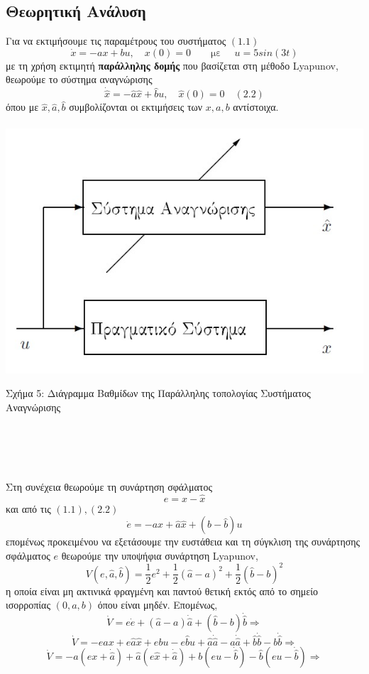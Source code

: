 \documentclass[12pt]{article}
\begin{document}
\subsection{Θεωρητική Ανάλυση}
Για να εκτιμήσουμε τις παραμέτρους του συστήματος $(1.1)$ 
\[ \dot{x}=-ax+bu , \quad x(0)=0 \qquad \text{με }  \quad u=5sin(3t) \]
με τη χρήση εκτιμητή \textbf{παράλληλης δομής} που βασίζεται στη μέθοδο Lyapunov, θεωρούμε το σύστημα αναγνώρισης
\[ \dot{\hat{x}}=-\hat{a}\hat{x}+\hat{b}u , \quad \hat{x}(0)=0 \quad (2.2) \]
όπου με $\hat{x},\hat{a},\hat{b}$ συμβολίζονται οι εκτιμήσεις των $x,a,b$ αντίστοιχα.
\\ \\
\includegraphics[width=\linewidth]{Par.jpg}
\centerline{Σχήμα 5: Διάγραμμα Βαθμίδων της Παράλληλης τοπολογίας Συστήματος Αναγνώρισης}
\\ \\ \\ \\
Στη συνέχεια θεωρούμε τη συνάρτηση σφάλματος 
\[e=x-\hat{x}\]
και από τις $(1.1),(2.2)$
\[\dot{e}=-ax+\hat{a}\hat{x}+(b-\hat{b})u  \]
επομένως προκειμένου να εξετάσουμε την ευστάθεια και τη σύγκλιση της συνάρτησης σφάλματος $e$ θεωρούμε την υποψήφια συνάρτηση Lyapunov,
\[V(e,\hat{a},\hat{b})=\frac{1}{2}e^{2}+\frac{1}{2}(\hat{a}-a)^2 + \frac{1}{2}(\hat{b}-b)^2\] η οποία είναι μη ακτινικά φραγμένη και παντού θετική εκτός από το σημείο ισορροπίας $(0,a,b)$ όπου είναι μηδέν.
Επομένως,
\[ \dot{V}=e\dot{e}+(\hat{a}-a)\dot{\hat{a}} +(\hat{b}-b)\dot{\hat{b}} \Rightarrow \]
\[\dot{V}= -eax+e\hat{a}\hat{x}+ebu-e\hat{b}u+\hat{a}\dot{\hat{a}}-a\dot{\hat{a}}+\hat{b}\dot{\hat{b}}-b\dot{\hat{b}} \Rightarrow \]
\[\dot{V}= -a(ex+\dot{\hat{a}})+\hat{a}(e\hat{x}+\dot{\hat{a}}) +b(eu-\dot{\hat{b}})-\hat{b}(eu-\dot{\hat{b}}) \Rightarrow \]
\end{document}
